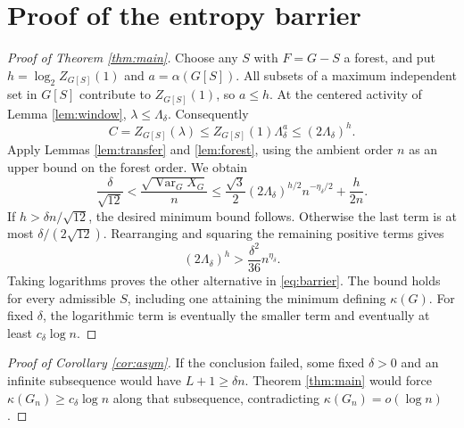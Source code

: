 \documentclass[10pt]{article}
\newcommand{\Var}{\operatorname{Var}}
\begin{document}
\section{Proof of the entropy barrier}
\begin{proof}[Proof of Theorem \ref{thm:main}]
Choose any \(S\) with \(F=G-S\) a forest, and put
\(h=\log_2 Z_{G[S]}(1)\) and \(a=\alpha(G[S])\).
All subsets of a maximum independent set in \(G[S]\) contribute to
\(Z_{G[S]}(1)\), so \(a\le h\). At the centered activity of
Lemma \ref{lem:window}, \(\lambda\le\Lambda_\delta\). Consequently
\begin{equation}\label{eq:corecost}
 C=Z_{G[S]}(\lambda)\le Z_{G[S]}(1)\Lambda_\delta^a
                   \le(2\Lambda_\delta)^h.
\end{equation}
Apply Lemmas \ref{lem:transfer} and \ref{lem:forest}, using the ambient
order \(n\) as an upper bound on the forest order. We obtain
\begin{equation}\label{eq:master}
 \frac{\delta}{\sqrt{12}}
 <\frac{\sqrt{\Var_GX_G}}n
 \le\frac{\sqrt3}{2}(2\Lambda_\delta)^{h/2}n^{-\eta_\delta/2}
                         +\frac{h}{2n}.
\end{equation}
If \(h>\delta n/\sqrt{12}\), the desired minimum bound follows.
Otherwise the last term is at most \(\delta/(2\sqrt{12})\).
Rearranging and squaring the remaining positive terms gives
\[
 (2\Lambda_\delta)^h>\frac{\delta^2}{36}n^{\eta_\delta}.
\]
Taking logarithms proves the other alternative in \eqref{eq:barrier}.
The bound holds for every admissible \(S\), including one attaining
the minimum defining \(\kappa(G)\). For fixed \(\delta\), the logarithmic
term is eventually the smaller term and eventually at least
\(c_\delta\log n\).
\end{proof}

\begin{proof}[Proof of Corollary \ref{cor:asym}]
If the conclusion failed, some fixed \(\delta>0\) and an infinite
subsequence would have \(L+1\ge\delta n\). Theorem \ref{thm:main} would
force \(\kappa(G_n)\ge c_\delta\log n\) along that subsequence,
contradicting \(\kappa(G_n)=o(\log n)\).
\end{proof}
\end{document}
